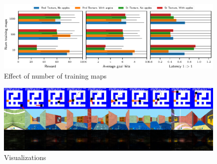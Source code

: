 \begin{figure}%
  \includegraphics[width=\linewidth]{images/plot_ntrain_summary.pdf}%
  \vspace{-1em}%
  \caption{Effect of number of training maps}
  \label{fig:num-training-maps}
\end{figure}

\begin{figure}
\includegraphics[width=\textwidth]{./exp-results/training-09x09-0127-on-0127.png}
\caption{Visualizations}
\label{fig:training-qualitative}
\end{figure}
